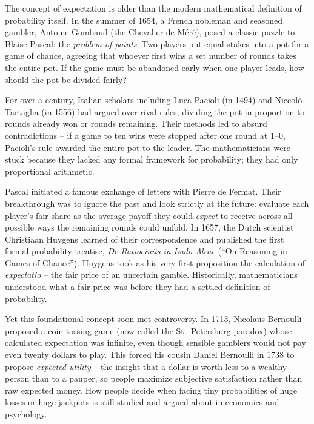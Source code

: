 \begin{historybox}
The concept of expectation is older than the modern mathematical definition of
probability itself. In the summer of 1654, a French nobleman and seasoned
gambler, Antoine Gombaud (the Chevalier de M\'er\'e), posed a classic puzzle to
Blaise Pascal: the \emph{problem of points}. Two players put equal stakes into a
pot for a game of chance, agreeing that whoever first wins a set number of
rounds takes the entire pot. If the game must be abandoned early when one
player leads, how should the pot be divided fairly?

For over a century, Italian scholars including Luca Pacioli (in 1494) and
Niccol\`o Tartaglia (in 1556) had argued over rival rules, dividing the pot in
proportion to rounds already won or rounds remaining. Their methods led to
absurd contradictions -- if a game to ten wins were stopped after one round at
$1\text{--}0$, Pacioli's rule awarded the entire pot to the leader. The
mathematicians were stuck because they lacked any formal framework for
probability; they had only proportional arithmetic.

Pascal initiated a famous exchange of letters with Pierre de Fermat. Their
breakthrough was to ignore the past and look strictly at the future: evaluate
each player's fair share as the average payoff they could \emph{expect} to
receive across all possible ways the remaining rounds could unfold. In 1657, the
Dutch scientist Christiaan Huygens learned of their correspondence and published
the first formal probability treatise, \emph{De Ratiociniis in Ludo Aleae}
(``On Reasoning in Games of Chance''). Huygens took as his very first
proposition the calculation of \emph{expectatio} -- the fair price of an
uncertain gamble. Historically, mathematicians understood what a fair price was
before they had a settled definition of probability.

Yet this foundational concept soon met controversy. In 1713, Nicolaus Bernoulli
proposed a coin-tossing game (now called the St.\ Petersburg paradox) whose
calculated expectation was infinite, even though sensible gamblers would not pay
even twenty dollars to play. This forced his cousin Daniel Bernoulli in 1738 to
propose \emph{expected utility} -- the insight that a dollar is worth less to a
wealthy person than to a pauper, so people maximize subjective satisfaction
rather than raw expected money. How people decide when facing tiny
probabilities of huge losses or huge jackpots is still studied and argued about
in economics and psychology.
\end{historybox}

